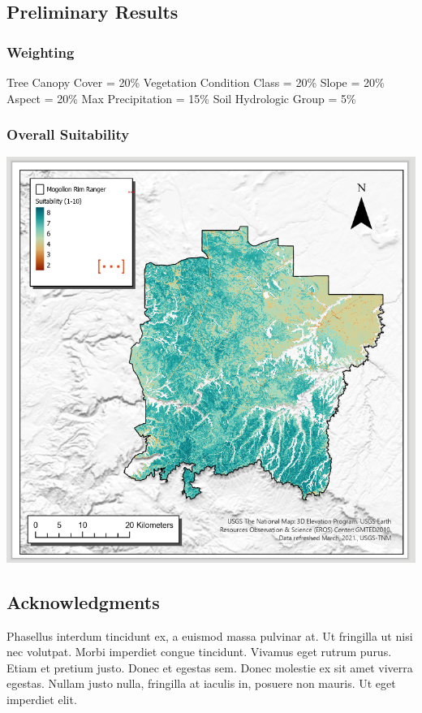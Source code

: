 \documentclass[
]{agujournal2019}
\begin{document}
\subsection{Preliminary Results}\label{preliminary-results}

\subsubsection{Weighting}\label{weighting}

Tree Canopy Cover = 20\% Vegetation Condition Class = 20\% Slope = 20\%
Aspect = 20\% Max Precipitation = 15\% Soil Hydrologic Group = 5\%

\subsubsection{Overall Suitability}\label{overall-suitability}

\includegraphics{images/PreliminarySuitabilityMap.PNG}

\subsection{Acknowledgments}\label{acknowledgments}

Phasellus interdum tincidunt ex, a euismod massa pulvinar at. Ut
fringilla ut nisi nec volutpat. Morbi imperdiet congue tincidunt.
Vivamus eget rutrum purus. Etiam et pretium justo. Donec et egestas sem.
Donec molestie ex sit amet viverra egestas. Nullam justo nulla,
fringilla at iaculis in, posuere non mauris. Ut eget imperdiet elit.
\end{document}
